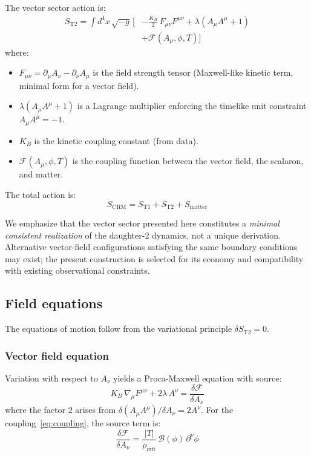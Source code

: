 \documentclass[aps,prd,twocolumn,superscriptaddress,nofootinbib]{revtex4-2}
\begin{document}
The vector sector action is:
\begin{align}
S_{\mathrm{T2}} = \int d^4x\,\sqrt{-g}\,\bigg[&
  -\frac{K_B}{2}\,F_{\mu\nu}F^{\mu\nu}
  + \lambda\!\left(A_\mu A^\mu + 1\right)
\nonumber \\
  &+ \mathcal{F}(A_\mu, \phi, T)
\bigg]
\label{eq:S_T2}
\end{align}
where:
\begin{itemize}
\item $F_{\mu\nu} = \partial_\mu A_\nu - \partial_\nu A_\mu$ is the field strength tensor (Maxwell-like kinetic term, minimal form for a vector field).
\item $\lambda(A_\mu A^\mu + 1)$ is a Lagrange multiplier enforcing the timelike unit constraint $A_\mu A^\mu = -1$.
\item $K_B$ is the kinetic coupling constant (from data).
\item $\mathcal{F}(A_\mu, \phi, T)$ is the coupling function between the vector field, the scalaron, and matter.
\end{itemize}

The total action is:
\begin{equation}
S_{\mathrm{CRM}} = S_{\mathrm{T1}} + S_{\mathrm{T2}} + S_{\mathrm{matter}}
\label{eq:S_total}
\end{equation}

We emphasize that the vector sector presented here constitutes a \emph{minimal consistent realization} of the daughter-2 dynamics, not a unique derivation. Alternative vector-field configurations satisfying the same boundary conditions may exist; the present construction is selected for its economy and compatibility with existing observational constraints.

\subsection{Field equations}
\label{sec:field_eqs}

The equations of motion follow from the variational principle $\delta S_{\mathrm{T2}} = 0$.

\subsubsection{Vector field equation}

Variation with respect to $A_\nu$ yields a Proca-Maxwell equation with source:
\begin{equation}
K_B\,\nabla_\mu F^{\mu\nu} + 2\lambda\,A^\nu = \frac{\delta\mathcal{F}}{\delta A_\nu}
\label{eq:vector_eom}
\end{equation}
where the factor $2$ arises from $\delta(A_\mu A^\mu)/\delta A_\nu = 2A^\nu$. For the coupling~\eqref{eq:coupling}, the source term is:
\begin{equation}
\frac{\delta\mathcal{F}}{\delta A_\nu} = \frac{|T|}{\rho_{\mathrm{crit}}}\,\mathcal{B}(\phi)\,\partial^\nu\phi
\label{eq:source}
\end{equation}
\end{document}
